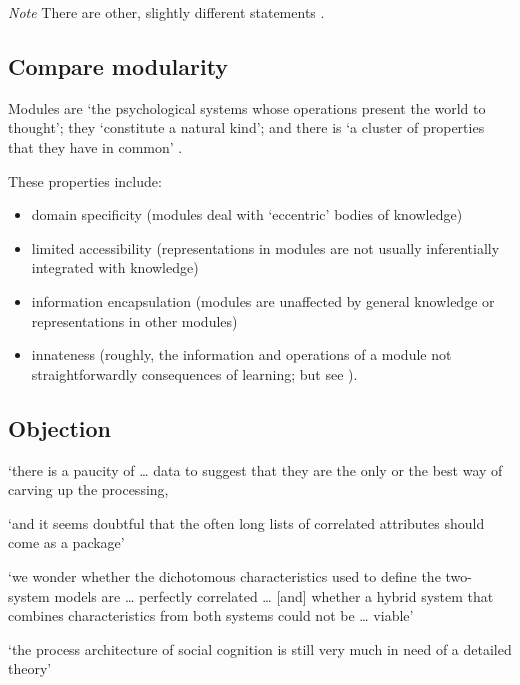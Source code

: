 \documentclass[12pt]{extarticle}
\begin{document}
\begin{multicols}{3}
\textit{Note} There are other, slightly different statements \citep[e.g.][]{carey:2009_origin}.

\subsection{Compare modularity}

Modules are ‘the psychological systems whose operations present the world to thought’;
   they ‘constitute a natural kind’; and
   there is ‘a cluster of properties that they have in common’ \citep[p.\ 101]{Fodor:1983dg}.

These properties include:

\begin{itemize}

\item domain specificity (modules deal with ‘eccentric’ bodies of knowledge)

\item limited accessibility (representations in modules are not usually inferentially integrated with knowledge)

\item information encapsulation (modules are unaffected by general knowledge or representations in other modules)

\item innateness (roughly, the information and operations of a module not straightforwardly consequences of learning; but see \citet{Samuels:2004ho}).

\end{itemize}

\subsection{Objection}

‘there is a paucity of … data to suggest that they are the only or the best way of carving up the processing,

‘and it seems doubtful that the often long lists of correlated attributes should come as a package’
\citep[p.\ 759]{adolphs_conceptual_2010}

‘we wonder whether the dichotomous characteristics used to define the two-system models are … perfectly correlated …
[and] whether a hybrid system that combines characteristics from both systems could not be … viable’
\citep[p.\ 537]{keren_two_2009}

‘the process architecture of social cognition is still very much in need of a detailed theory’
\citep[p.\ 759]{adolphs_conceptual_2010}
\citep[p.\ 517]{Carey:1996hl}




\end{multicols}
\end{document}
